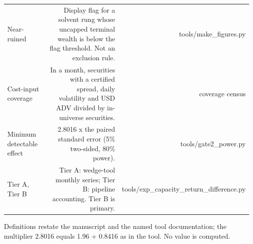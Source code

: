 \begin{table}[t]
\begin{tabular}{lrr}
Near-ruined & Display flag for a solvent rung whose uncapped terminal wealth is below the flag threshold. Not an exclusion rule. & tools/make\_figures.py \\
Cost-input coverage & In a month, securities with a certified spread, daily volatility and USD ADV divided by in-universe securities. & coverage census \\
Minimum detectable effect & 2.8016 x the paired standard error (5\% two-sided, 80\% power). & tools/gate2\_power.py \\
Tier A, Tier B & Tier A: wedge-tool monthly series; Tier B: pipeline accounting. Tier B is primary. & tools/exp\_capacity\_return\_difference.py \\
\bottomrule
\end{tabular}
\par\vspace{2pt}
\parbox{\textwidth}{\footnotesize Definitions restate the manuscript and the named tool documentation; the multiplier 2.8016 equals 1.96 + 0.8416 as in the tool. No value is computed.}
\end{table}
